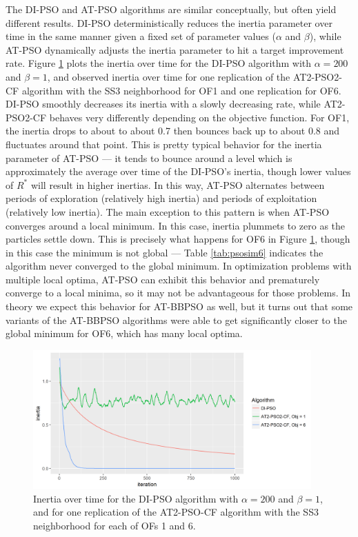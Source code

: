 \documentclass[cmbright]{staauth}
\begin{document}
The DI-PSO and AT-PSO algorithms are similar conceptually, but often yield different results. DI-PSO deterministically reduces the inertia parameter over time in the same manner given a fixed set of parameter values ($\alpha$ and $\beta$), while AT-PSO dynamically adjusts the inertia parameter to hit a target improvement rate. Figure \ref{fig:inertia} plots the inertia over time for the DI-PSO algorithm with $\alpha=200$ and $\beta=1$, and observed inertia over time for one replication of the AT2-PSO2-CF algorithm with the SS3 neighborhood for OF1 and one replication for OF6. DI-PSO smoothly decreases its inertia with a slowly decreasing rate, while AT2-PSO2-CF behaves very differently depending on the objective function. For OF1, the inertia drops to about to about 0.7 then bounces back up to about 0.8 and fluctuates around that point. This is pretty typical behavior for the inertia parameter of AT-PSO --- it tends to bounce around a level which is approximately the average over time of the DI-PSO's inertia, though lower values of $R^*$ will result in higher inertias. In this way, AT-PSO alternates between periods of exploration (relatively high inertia) and periods of exploitation (relatively low inertia). The main exception to this pattern is when AT-PSO converges around a local minimum. In this case, inertia plummets to zero as the particles settle down. This is precisely what happens for OF6 in Figure \ref{fig:inertia}, though in this case the minimum is not global --- Table \ref{tab:psosim6} indicates the algorithm never converged to the global minimum. In optimization problems with multiple local optima, AT-PSO can exhibit this behavior and prematurely converge to a local minima, so it may not be advantageous for those problems. In theory we expect this behavior for AT-BBPSO as well, but it turns out that some variants of the AT-BBPSO algorithms were able to get significantly closer to the global minimum for OF6, which has many local optima.

\begin{figure}[p]
\centering
\includegraphics[width=0.95\textwidth]{../code/psosims/inertiaplot.png}
\caption{Inertia over time for the DI-PSO algorithm with $\alpha=200$ and $\beta=1$, and for one replication of the AT2-PSO-CF algorithm with the SS3 neighborhood for each of OFs 1 and 6.}
\label{fig:inertia}
\end{figure}
\end{document}
